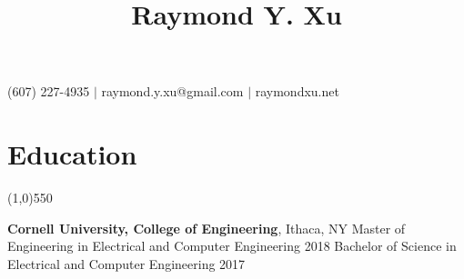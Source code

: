 \documentclass[11pt]{article} %
\title{\vspace{-6ex} \Huge Raymond Y. Xu \vspace{-4ex}}
\author{}
\date{} %
\begin{document}
	\maketitle
	\vspace{-3ex}
	\begin{center}
		(607) 227-4935 $|$ raymond.y.xu@gmail.com $|$ raymondxu.net\\
		 \vspace{-3ex}
	\end{center}
	\section*{Education}
	\vspace{-7ex}
	\begin{center}
    \line(1,0){550}
    \end{center}
    \vspace{0ex}
    {\large\textbf{Cornell University, College of Engineering}}, Ithaca, NY \newline
	Master of Engineering in Electrical and Computer Engineering \hfill 2018\newline
	Bachelor of Science in Electrical and Computer Engineering%
	\hfill 2017\newline
	\vspace{-4ex}
\end{document}

